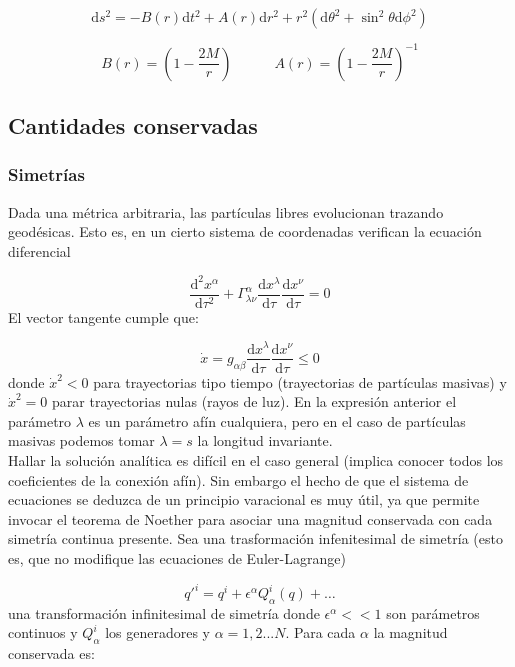 \documentclass[12pt,a4paper]{book}
\numberwithin{equation}{section}
\numberwithin{figure}{section}
\newcommand{\parentesis}[1]{\left( #1  \right)}
\newcommand{\D}{\mathrm{d}}
\newcommand{\derivadas}[2]{\frac{\D #1}{\D #2}}
\newcommand{\tquad}{\quad \quad \quad}
\begin{document}
\begin{equation}
\D s^2 = - B(r) \D t^2 + A(r) \D r^2 + r^2(\D \theta^2 + \sin^2 \theta \D \phi^2) 
\label{Ec:04.002-Schwarzschild}
\end{equation}

\begin{equation}
B(r) =\parentesis{1-\frac{2M}{r}} \tquad A(r) = \parentesis{1-\frac{2M}{r}}^{-1}
\end{equation}

\subsection{Cantidades conservadas}

\subsubsection{Simetrías}

Dada una métrica arbitraria, las partículas libres evolucionan trazando geodésicas. Esto es, en un cierto sistema de coordenadas verifican la ecuación diferencial


\begin{equation}
\derivadas{^2x^\alpha}{\tau^2} + \Gamma^\alpha_{\lambda \nu} \derivadas{x^\lambda}{\tau	} \derivadas{x^\nu}{\tau} = 0
\end{equation}
El vector tangente cumple que:

\begin{equation}
\dot{x} = g_{\alpha \beta} \derivadas{x^\lambda}{\tau	} \derivadas{x^\nu}{\tau} \leq 0
\end{equation}
donde $\dot{x}^2<0$ para trayectorias tipo tiempo (trayectorias de partículas masivas) y $\dot{x}^2=0$ parar trayectorias nulas (rayos de luz). En la expresión anterior el parámetro $\lambda$ es un parámetro afín cualquiera, pero en el caso de partículas masivas podemos tomar $\lambda=s$ la longitud invariante. \\

Hallar la solución analítica es difícil en el caso general (implica conocer todos los coeficientes de la conexión afín). Sin embargo el hecho de que el sistema de ecuaciones se deduzca de un principio varacional es muy útil, ya que permite invocar el teorema de Noether para asociar una magnitud conservada con cada simetría continua presente. Sea  una trasformación infenitesimal de simetría (esto es, que no modifique las ecuaciones de Euler-Lagrange) 

\begin{equation}
q'^i = q^i + \epsilon^\alpha Q_{\alpha}^i (q) + \ldots
\end{equation}
una transformación infinitesimal de simetría donde $\epsilon^\alpha << 1$ son parámetros continuos y $Q_\alpha^i$ los generadores y $\alpha=1,2...N$. Para cada $\alpha$ la magnitud conservada es:
\end{document}
